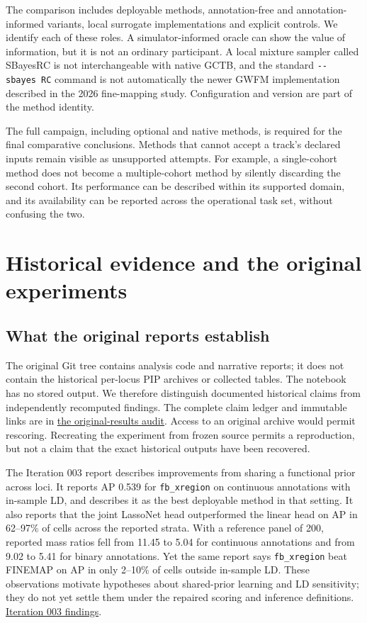 \documentclass[
  british,
  10pt,
]{article}
\begin{document}
The comparison includes deployable methods, annotation-free and
annotation-informed variants, local surrogate implementations and
explicit controls. We identify each of these roles. A simulator-informed
oracle can show the value of information, but it is not an ordinary
participant. A local mixture sampler called SBayesRC is not
interchangeable with native GCTB, and the standard
\texttt{-\/-sbayes\ RC} command is not automatically the newer GWFM
implementation described in the 2026 fine-mapping study. Configuration
and version are part of the method identity.

The full campaign, including optional and native methods, is required
for the final comparative conclusions. Methods that cannot accept a
track's declared inputs remain visible as unsupported attempts. For
example, a single-cohort method does not become a multiple-cohort method
by silently discarding the second cohort. Its performance can be
described within its supported domain, and its availability can be
reported across the operational task set, without confusing the two.

\section{Historical evidence and the original
experiments}\label{historical-evidence-and-the-original-experiments}

\subsection{What the original reports
establish}\label{what-the-original-reports-establish}

The original Git tree contains analysis code and narrative reports; it
does not contain the historical per-locus PIP archives or collected
tables. The notebook has no stored output. We therefore distinguish
documented historical claims from independently recomputed findings. The
complete claim ledger and immutable links are in
\href{../docs/original-results-audit.md}{the original-results audit}.
Access to an original archive would permit rescoring. Recreating the
experiment from frozen source permits a reproduction, but not a claim
that the exact historical outputs have been recovered.

The Iteration 003 report describes improvements from sharing a
functional prior across loci. It reports AP 0.539 for
\texttt{fb\_xregion} on continuous annotations with in-sample LD, and
describes it as the best deployable method in that setting. It also
reports that the joint LassoNet head outperformed the linear head on AP
in 62--97\% of cells across the reported strata. With a reference panel
of 200, reported mass ratios fell from 11.45 to 5.04 for continuous
annotations and from 9.02 to 5.41 for binary annotations. Yet the same
report says \texttt{fb\_xregion} beat FINEMAP on AP in only 2--10\% of
cells outside in-sample LD. These observations motivate hypotheses about
shared-prior learning and LD sensitivity; they do not yet settle them
under the repaired scoring and inference definitions.
\href{https://github.com/lucassiu14/fine-mapping-benchmark/blob/f053fdf318a3abe2c44eeb0ac3f3c99a03979b81/docs/autoresearch/iteration-003.md\#L246-L265}{Iteration
003 findings}.
\end{document}
